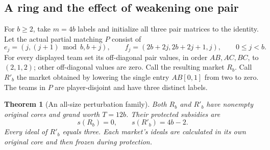 \documentclass[11pt]{article}
\newtheorem{theorem}{Theorem}[section]
\theoremstyle{remark}
\begin{document}
\subsection{A ring and the effect of weakening one pair}
For $b\ge2$, take $m=4b$ labels and initialize all three pair matrices
to the identity. Let the actual partial matching $P$ consist of
\[
 e_j=(j,(j+1)\bmod b,b+j),\qquad
 f_j=(2b+2j,2b+2j+1,j),\qquad 0\le j<b.
\]
For every displayed team set its off-diagonal pair values, in order
$AB,AC,BC$, to $(2,1,2)$; other off-diagonal values are zero.
Call the resulting market $R_b$. Call $R'_b$ the market obtained by
lowering the single entry $AB[0,1]$ from two to zero. The teams in $P$
are player-disjoint and have three distinct labels.

\begin{theorem}[An all-size perturbation family]\label{anc:ring}
Both $R_b$ and $R'_b$ have nonempty original cores and grand worth
$T=12b$. Their protected subsidies are
\[
                          s(R_b)=0,\qquad s(R'_b)=4b-2.
\]
Every ideal of $R'_b$ equals three. Each market's ideals are calculated
in its own original core and then frozen during protection.
\end{theorem}
\end{document}
